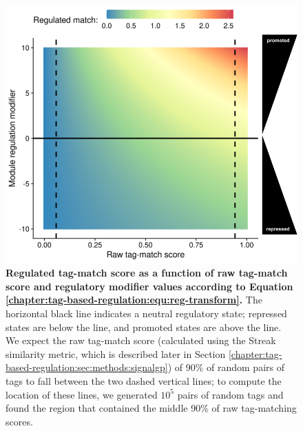\begin{figure}[htbp]
    \centering
    \includegraphics[width=0.6\columnwidth]{chapters/05-tag-based-genetic-regulation/media/expontential-regulation.png}
    \caption{\small
    \textbf{Regulated tag-match score as a function of raw tag-match score and regulatory modifier values according to Equation \ref{chapter:tag-based-regulation:equ:reg-transform}.}
    The horizontal black line indicates a neutral regulatory state; 
    repressed states are below the line, and promoted states are above the line.
    We expect the raw tag-match score (calculated using the Streak similarity metric, which is described later in Section \ref{chapter:tag-based-regulation:sec:methods:signalgp}) of 90\% of random pairs of tags to fall between the two dashed vertical lines; to compute the location of these lines, we generated $10^{5}$ pairs of random tags and found the region that contained the middle 90\% of raw tag-matching scores.
    }
    \label{chapter:tag-based-regulation:fig:exponential-regulation-function}
\end{figure}